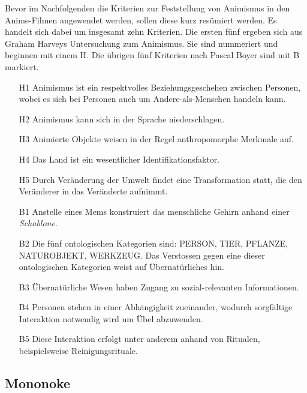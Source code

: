 Bevor im Nachfolgenden die Kriterien zur Feststellung von Animismus in den Anime-Filmen angewendet werden, sollen diese kurz resümiert werden. Es handelt sich dabei um insgesamt zehn Kriterien. Die ersten fünf ergeben sich aus Graham Harveys Untersuchung zum Animismus. Sie sind nummeriert und beginnen mit einem H. Die übrigen fünf Kriterien nach Pascal Boyer sind mit B markiert.
\begin{itemize}
	\item [H1] Animismus ist ein respektvolles Beziehungsgeschehen zwischen Personen, wobei es sich bei Personen auch um Andere-als-Menschen handeln kann.
	\item [H2] Animismus kann sich in der Sprache niederschlagen.
	\item [H3] Animierte Objekte weisen in der Regel anthropomorphe Merkmale auf.
	\item [H4] Das Land ist ein wesentlicher Identifikationsfaktor.
	\item [H5] Durch Veränderung der Umwelt findet eine Transformation statt, die den Veränderer in das Veränderte aufnimmt.
	\item [B1] Anstelle eines Mems konstruiert das menschliche Gehirn anhand einer \emph{Schablone}.
	\item [B2] Die fünf ontologischen Kategorien sind: PERSON, TIER, PFLANZE, \\\mbox{NATUROBJEKT}, WERKZEUG. Das Verstossen gegen eine dieser onto\-logischen Kategorien weist auf Übernatürliches hin.
	\item [B3] Übernatürliche Wesen haben Zugang zu sozial-relevanten Informationen. 
	\item [B4] Personen stehen in einer Abhängigkeit zueinander, wodurch sorgfältige Interaktion notwendig wird um Übel abzuwenden.
	\item [B5] Diese Interaktion erfolgt unter anderem anhand von Ritualen, beispiels\-weise Reinigungsrituale.
\end{itemize} 

\subsection{Mononoke} 
